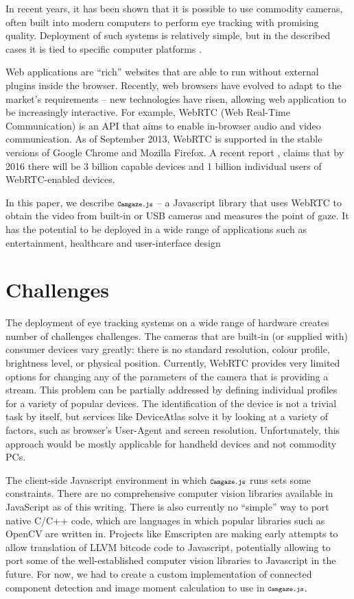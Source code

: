 \documentclass[annual]{acmsiggraph}
\newcommand{\Acronym}[1]{\ensuremath{{\small{\texttt{#1}}}}}
\newcommand{\Name}{\Acronym{Camgaze.js}} \newcommand{\False}{\Constant{false}}
\newcommand{\Constant}[1]{\ensuremath{\small{\texttt{#1}}}}
\begin{document}
In recent years, it has been shown \cite{SanAgustin2009}\cite{Sewell2010}
that it is possible to use commodity cameras, often built into modern
computers to perform eye tracking with promising quality. Deployment of such
systems is relatively simple, but in the described cases it is tied to specific
computer platforms \cite{holland2012eye}.

Web applications are “rich” websites that are able to run without external
plugins inside the browser. Recently, web browsers have evolved to adapt to
the market’s requirements -- new technologies have risen, allowing web
application to be increasingly interactive. For example, WebRTC (Web Real-Time
Communication) is an API that aims to enable in-browser audio and video
communication. As of September 2013, WebRTC is supported in the stable versions
of Google Chrome and Mozilla Firefox. A recent report
\cite{DisruptiveAnalysis2013}, claims that by 2016 there will be
3 billion capable devices and 1 billion individual users of WebRTC-enabled
devices.

In this paper, we describe $\Name$ -- a Javascript library that uses WebRTC to
obtain the video from built-in or USB cameras and measures the point of gaze.
It has the potential to be deployed in a wide range of applications such as
entertainment, healthcare and user-interface design



\section{Challenges}

The deployment of eye tracking systems on a wide range of hardware creates
number of challenges challenges.  The cameras that are built-in (or supplied
with) consumer devices vary greatly: there is no standard resolution, colour
profile, brightness level, or physical position. Currently, WebRTC provides
very limited options for changing any of the parameters of the camera that is
providing a stream. This problem can be partially addressed by defining
individual profiles for a variety of popular devices. The identification of the
device is not a trivial task by itself, but services like DeviceAtlas
\cite{DeviceAtlas2013} solve it by looking at a variety of factors, such as
browser’s User-Agent and screen resolution.  Unfortunately, this approach would
be mostly applicable for handheld devices and not commodity PCs.

The client-side Javascript environment in which $\Name$ runs sets some
constraints. There are no comprehensive computer vision libraries available in
JavaScript as of this writing.  There is also currently no “simple” way to port
native C/C++ code, which are languages in which popular libraries such as
OpenCV are written in.  Projects like Emscripten are making early attempts to
allow translation of LLVM bitcode code to Javascript, potentially allowing to
port some of the well-established computer vision libraries to Javascript in
the future. For now, we had to create a custom implementation of connected
component detection and image moment calculation to use in $\Name$.
\end{document}
